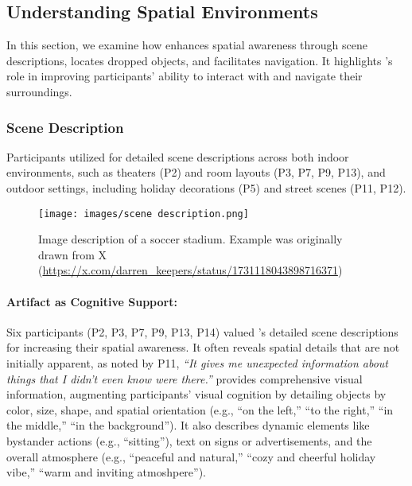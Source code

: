 \subsection{Understanding Spatial Environments}

In this section, we examine how \bma{} enhances spatial awareness through scene descriptions, locates dropped objects, and facilitates navigation. It highlights \bma's role in improving participants' ability to interact with and navigate their surroundings.



\subsubsection{Scene Description}
\label{scene}

Participants utilized \bma{} for detailed scene descriptions across both indoor environments, such as theaters (P2) and room layouts (P3, P7, P9, P13), and outdoor settings, including holiday decorations (P5) and street scenes (P11, P12). 
% 


\begin{figure}[t!]
\centering
\texttt{[image: images/scene description.png]}
\caption{Image description of a soccer stadium. Example was originally drawn from X (\url{https://x.com/darren_keepers/status/1731118043898716371})}
\end{figure}


\paragraph{Artifact as Cognitive Support:}


Six participants (P2, P3, P7, P9, P13, P14) valued \bma's detailed scene descriptions for increasing their spatial awareness. 
It often reveals spatial details that are not initially apparent, as noted by P11, \textit{``It gives me unexpected information about things that I didn't even know were there.''} 
% 
\bma{} provides comprehensive visual information, augmenting participants' visual cognition by detailing objects by color, size, shape, and spatial orientation (e.g., ``on the left,'' ``to the right,'' ``in the middle,'' ``in the background''). It also describes dynamic elements like bystander actions (e.g., ``sitting''), text on signs or advertisements, and the overall atmosphere (e.g., ``peaceful and natural,'' ``cozy and cheerful holiday vibe,'' ``warm and inviting atmoshpere''). 


